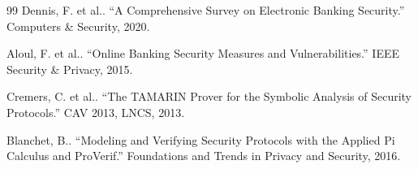\begin{thebibliography}{99}
\label{ref:42}
Dennis, F. et al.. ``A Comprehensive Survey on Electronic Banking Security.'' Computers \& Security, 2020.

\label{ref:43}
Aloul, F. et al.. ``Online Banking Security Measures and Vulnerabilities.'' IEEE Security \& Privacy, 2015.

\label{ref:44}
Cremers, C. et al.. ``The TAMARIN Prover for the Symbolic Analysis of Security Protocols.'' CAV 2013, LNCS, 2013.

\label{ref:45}
Blanchet, B.. ``Modeling and Verifying Security Protocols with the Applied Pi Calculus and ProVerif.'' Foundations and Trends in Privacy and Security, 2016.

\end{thebibliography}
